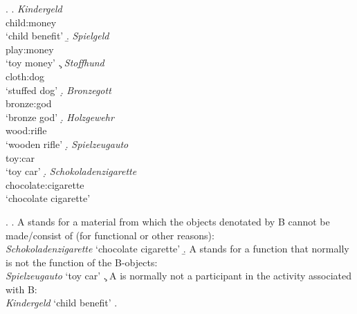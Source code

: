 \ex. %
\a. \gll 
\emph{Kindergeld}\\
child:money\\
 `child benefit'
\b. \gll 
\emph{Spielgeld}\\
play:money\\
 `toy money'
\c. \gll 
\emph{Stoffhund}\\
cloth:dog\\ 
`stuffed dog'
\d. \gll 
\emph{Bronzegott}\\
bronze:god\\
`bronze god'
\d. \gll 
\emph{Holzgewehr}\\
wood:rifle\\
`wooden rifle'
\d. \gll 
\emph{Spielzeugauto}\\
toy:car\\ 
`toy car'
\d. \gll 
\emph{Schokoladenzigarette}\\
chocolate:cigarette\\ 
`chocolate cigarette'


\ex. 
\a. A stands for a material from which the objects denotated by B
cannot be made/consist of (for functional or other reasons):\\
\emph{Schokoladenzigarette} `chocolate cigarette'
\b. A stands for a function that normally is not the function of the
B-objects:\\ \emph{Spielzeugauto} `toy car'
\c. A is normally not a participant in the activity associated with
B:\\ \emph{Kindergeld} `child benefit'
\z.

